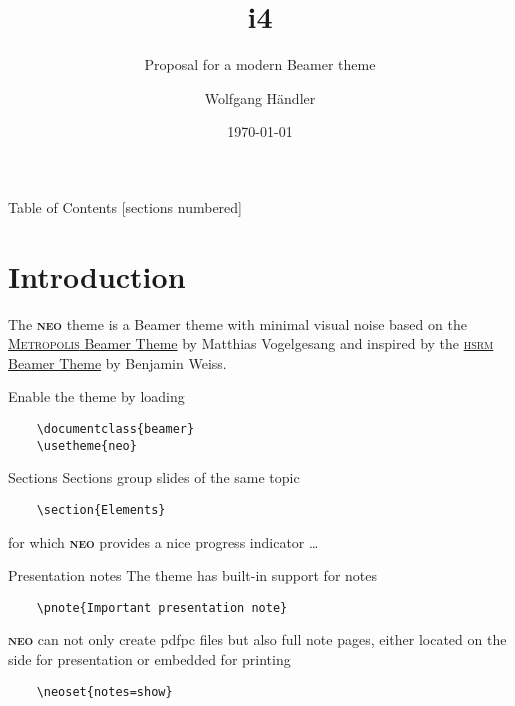 \documentclass[10pt]{beamer}
\title[i4\themename Theme Demo]{i4\themename}
\subtitle{Proposal for a modern Beamer theme}
\date{\today}
\author{Wolfgang Händler}
\institute{Friedrich-Alexander-Universität Erlangen-Nürnberg}
\newcommand{\themename}{\textbf{\textsc{neo}}\xspace}
\begin{document}
\maketitle[intern]

\begin{frame}{Table of Contents}
  [sections numbered]
  \tableofcontents[hideallsubsections]
\end{frame}

\section{Introduction}

\begin{frame}[fragile]
  The \themename theme is a Beamer theme with minimal visual noise
  based on the \href{https://github.com/matze/mtheme}{\textsc{Metropolis} Beamer Theme} by Matthias Vogelgesang and inspired by the \href{https://github.com/hsrmbeamertheme/hsrmbeamertheme}{\textsc{hsrm} Beamer Theme} by Benjamin Weiss.

  Enable the theme by loading

  \begin{verbatim}    \documentclass{beamer}
    \usetheme{neo}\end{verbatim}

\end{frame}
\begin{frame}[fragile]{Sections}
  Sections group slides of the same topic

  \begin{verbatim}    \section{Elements}\end{verbatim}

  for which \themename provides a nice progress indicator \ldots
\end{frame}

\begin{frame}[fragile]{Presentation notes}
  The theme has built-in support for notes

  \begin{verbatim}    \pnote{Important presentation note}\end{verbatim}

  \themename can not only create pdfpc files but also full note pages, either located on the side for presentation or embedded for printing
  \begin{verbatim}    \neoset{notes=show}\end{verbatim}
\end{frame}
\end{document}
